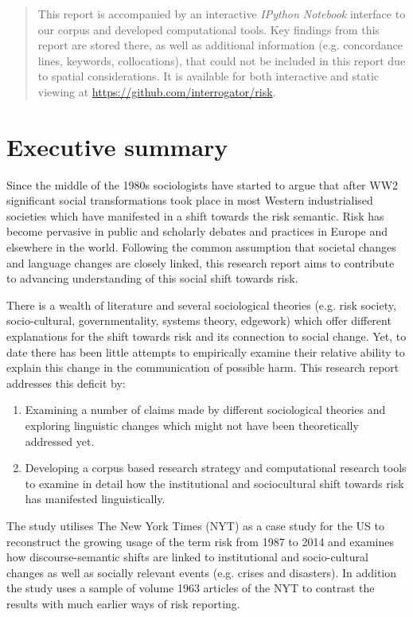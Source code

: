 \documentclass{report}
\begin{document}
\begin{abstract}
    This report is accompanied by an interactive \emph{IPython Notebook} interface to our corpus and developed computational tools. Key findings from this report are stored there, as well as additional information (e.g. concordance lines, keywords, collocations), that could not be included in this report due to spatial considerations. It is available for both interactive and static viewing at \url{https://github.com/interrogator/risk}.

    \end{abstract}
    \cleardoublepage
    \singlespacing
    \tableofcontents
    \cleardoublepage
    \listoftables
    \cleardoublepage
    \listoffigures
    \cleardoublepage
    \onehalfspacing

\section*{Executive summary}

\noindent Since the middle of the 1980s sociologists have started to argue that after WW2 significant social transformations took place in most Western industrialised societies which have manifested in a shift towards the risk semantic. Risk has become pervasive in public and scholarly debates and practices in Europe and elsewhere in the world. Following the common assumption that societal changes and language changes are closely linked, this research report aims to contribute to advancing understanding of this social shift towards risk. 

There is a wealth of literature and several sociological theories (e.g. risk society, socio-cultural, governmentality, systems theory, edgework) which offer different explanations for the shift towards risk and its connection to social change. Yet, to date there has been little attempts to empirically examine their relative ability to explain this change in the communication of possible harm. This research report addresses this deficit by:
%
\begin{enumerate}
\item Examining a number of claims made by different sociological theories and exploring linguistic changes which might not have been theoretically addressed yet. 
\item Developing a corpus based research strategy and computational research tools to examine in detail how the institutional and sociocultural shift towards risk has manifested linguistically.
\end{enumerate}
%
The study utilises The New York Times (NYT) as a case study for the US to reconstruct the growing usage of the term risk from 1987 to 2014 and examines how discourse-semantic shifts are linked to institutional and socio-cultural changes as well as socially relevant events (e.g. crises and disasters). In addition the study uses a sample of volume 1963 articles of the NYT to contrast the results with much earlier ways of risk reporting.
\end{document}
